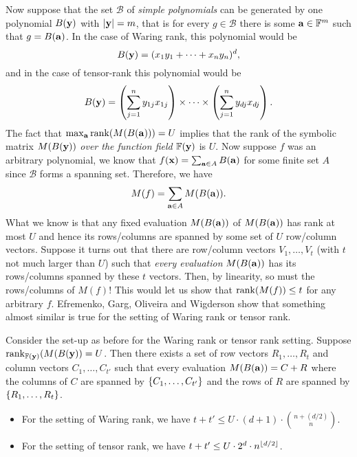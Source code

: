 Now suppose that the set $\mathcal{B}$ of \emph{simple polynomials} can be generated by one polynomial $B(\mathbf{y})$ with $\left|\mathbf{y}\right| = m$, that is for every $g\in \mathcal{B}$ there is some $\mathbf{a} \in \mathbb{F}^m$ such that $g = B(\mathbf{a})$. In the case of Waring rank, this polynomial would be \[B(\mathbf{y}) = (x_1 y_1 + \cdots + x_ny_n)^d,\] and in the case of tensor-rank this polynomial would be
\[ B(\mathbf{y}) = \left(\sum_{j=1}^n y_{1j} x_{1j}\right) \times \cdots \times \left(\sum_{j=1}^n y_{dj} x_{dj}\right). 
  \]
  The fact that $\max_{\mathbf{a}} \operatorname{rank}(M(B(\mathbf{a}))) = U$ implies that the rank of the symbolic matrix $M(B(\mathbf{y}))$ \emph{over the function field $\mathbb{F}(\mathbf{y})$} is $U$. Now suppose $f$ was an arbitrary polynomial, we know that $f(\mathbf{x}) = \sum_{\mathbf{a}\in A} B(\mathbf{a})$ for some finite set $A$ since $\mathcal{B}$ forms a spanning set. Therefore, we have
  \[
    M(f) = \sum_{\mathbf{a}\in A} M(B(\mathbf{a})).
  \]
  What we know is that any fixed evaluation $M(B(\mathbf{a}))$ of $M(B(\mathbf{a}))$ has rank at most $U$ and hence its rows/columns are spanned by some set of $U$ row/column vectors. Suppose it turns out that there are row/column vectors $V_1,\ldots, V_{t}$ (with $t$ not much larger than $U$) such that \emph{every evaluation} $M(B(\mathbf{a}))$ has its rows/columns spanned by these $t$ vectors. Then, by linearity, so must the rows/columns of $M(f)$! This would let us show that $\operatorname{rank}(M(f)) \leq t$  for any arbitrary $f$. Efremenko, Garg, Oliveira and Wigderson show that something almost similar is true for the setting of Waring rank or tensor rank.

  \begin{lemma} \label{lem:limitation:decomposition-eval-space}
    Consider the set-up as before for the Waring rank or tensor rank setting. Suppose $\operatorname{rank}_{\mathbb{F}(\mathbf{y})}(M(B(\mathbf{y})) = U$. Then there exists a set of row vectors $R_1,\ldots, R_t$ and column vectors $C_1,\ldots, C_{t'}$ such that every evaluation $M(B(\mathbf{a})) = C + R$ where the columns of $C$ are spanned by $\left\{C_1,\ldots, C_{t'}\right\}$ and the rows of $R$ are spanned by $\left\{R_1,\ldots, R_t\right\}$.

    \begin{itemize}
    \item  For the setting of Waring rank, we have $t + t' \leq U \cdot (d+1) \cdot \binom{n+(d/2)}{n}$.

    \item For the setting of tensor rank, we have $t+t' \leq U \cdot 2^{d} \cdot n^{\lfloor d/2 \rfloor}$.
    \end{itemize}
  \end{lemma}

